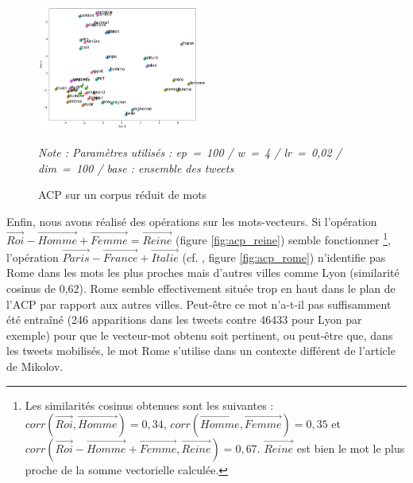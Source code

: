 \documentclass[11pt,french,french]{article}
\let\rmarkdownfootnote\footnote%
\def\footnote{\protect\rmarkdownfootnote}
\begin{document}
\begin{figure}
\begin{center}
\includegraphics[width=0.5\textwidth]{img/acp_gensim.png}
\captionsetup{margin=0cm,format=hang,justification=justified}
\caption{ACP sur un corpus réduit de mots}\label{fig:acp_gensim}
\end{center}
\vspace{-0.3cm}
\footnotesize
\emph{Note : Paramètres utilisés : ep = 100 / w = 4 / lr = 0,02 / dim = 100 / base : ensemble des tweets }
\end{figure}

Enfin, nous avons réalisé des opérations sur les mots-vecteurs. Si l'opération \(\overrightarrow{Roi} - \overrightarrow{Homme} + \overrightarrow{Femme} = \overrightarrow{Reine}\) (figure \ref{fig:acp_reine}) semble fonctionner
\footnote{Les similarités cosinus obtenues sont les suivantes : \(corr(\overrightarrow{Roi}, \overrightarrow{Homme}) = 0,34\), \(corr(\overrightarrow{Homme}, \overrightarrow{Femme}) = 0,35\) et \(corr(\overrightarrow{Roi} - \overrightarrow{Homme} + \overrightarrow{Femme} , \overrightarrow{Reine}) = 0,67\). \(\overrightarrow{Reine}\) est bien le mot le plus proche de la somme vectorielle calculée.},
l'opération \(\overrightarrow{Paris} - \overrightarrow{France} + \overrightarrow{Italie}\) (cf. \cite{Mikolov}, figure \ref{fig:acp_rome}) n'identifie pas \og Rome \fg{} dans les mots les plus proches mais d'autres villes comme \og Lyon \fg{} (similarité cosinus de 0,62). \og Rome \fg{} semble effectivement située \og trop en haut\fg{} dans le plan de l'ACP par rapport aux autres villes. Peut-être ce mot n'a-t-il pas suffisamment été entraîné (246 apparitions dans les tweets contre 46433 pour Lyon par exemple) pour que le vecteur-mot obtenu soit pertinent, ou peut-être que, dans les tweets mobilisés, le mot \og Rome \fg{} s'utilise dans un contexte différent de l'article de Mikolov.
\end{document}
